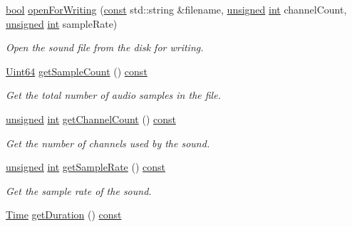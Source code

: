 \begin{DoxyCompactItemize}
\hyperlink{term__entry_8h_a002004ba5d663f149f6c38064926abac}{bool} \hyperlink{classsf_1_1_input_sound_file_a84f32fdf5fa619538506395c3c5a030a}{open\-For\-Writing} (\hyperlink{term__entry_8h_a57bd63ce7f9a353488880e3de6692d5a}{const} std\-::string \&filename, \hyperlink{curses_8priv_8h_aca40206900cfc164654362fa8d4ad1e6}{unsigned} \hyperlink{term__entry_8h_ad65b480f8c8270356b45a9890f6499ae}{int} channel\-Count, \hyperlink{curses_8priv_8h_aca40206900cfc164654362fa8d4ad1e6}{unsigned} \hyperlink{term__entry_8h_ad65b480f8c8270356b45a9890f6499ae}{int} sample\-Rate)
\begin{DoxyCompactList}\small\item\em Open the sound file from the disk for writing. \end{DoxyCompactList}\item 
\hyperlink{namespacesf_add9ac83466d96b9f50a009b9f4064266}{Uint64} \hyperlink{classsf_1_1_input_sound_file_a0c7d3293a5b0ed6aff674d5c8bcc1cdf}{get\-Sample\-Count} () \hyperlink{term__entry_8h_a57bd63ce7f9a353488880e3de6692d5a}{const} 
\begin{DoxyCompactList}\small\item\em Get the total number of audio samples in the file. \end{DoxyCompactList}\item 
\hyperlink{curses_8priv_8h_aca40206900cfc164654362fa8d4ad1e6}{unsigned} \hyperlink{term__entry_8h_ad65b480f8c8270356b45a9890f6499ae}{int} \hyperlink{classsf_1_1_input_sound_file_a3a3d113d0f093c806edeb47a0eb509bd}{get\-Channel\-Count} () \hyperlink{term__entry_8h_a57bd63ce7f9a353488880e3de6692d5a}{const} 
\begin{DoxyCompactList}\small\item\em Get the number of channels used by the sound. \end{DoxyCompactList}\item 
\hyperlink{curses_8priv_8h_aca40206900cfc164654362fa8d4ad1e6}{unsigned} \hyperlink{term__entry_8h_ad65b480f8c8270356b45a9890f6499ae}{int} \hyperlink{classsf_1_1_input_sound_file_adfbd1eaaf9fc0b469311fc159f5a3ecb}{get\-Sample\-Rate} () \hyperlink{term__entry_8h_a57bd63ce7f9a353488880e3de6692d5a}{const} 
\begin{DoxyCompactList}\small\item\em Get the sample rate of the sound. \end{DoxyCompactList}\item 
\hyperlink{classsf_1_1_time}{Time} \hyperlink{classsf_1_1_input_sound_file_a8c5707b202d8785f806bd6604a9e19c5}{get\-Duration} () \hyperlink{term__entry_8h_a57bd63ce7f9a353488880e3de6692d5a}{const} 

\end{DoxyCompactItemize}
